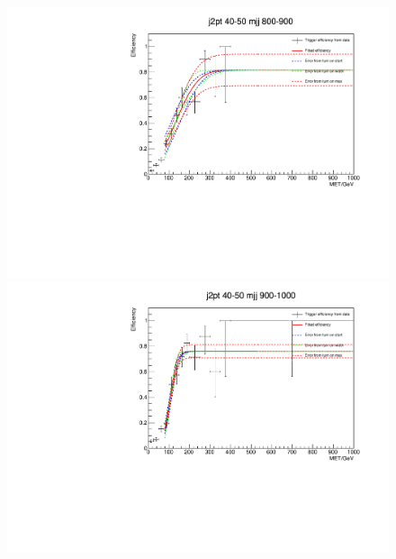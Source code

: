 \begin{figure}[h!]
  \begin{center}
    \includegraphics[width=.6\largefigwidth]{plots/parked/trigfitplots/hData_MET_1D_23D.pdf}
    \includegraphics[width=.6\largefigwidth]{plots/parked/trigfitplots/hData_MET_1D_24D.pdf}


\end{center}
\end{figure}
